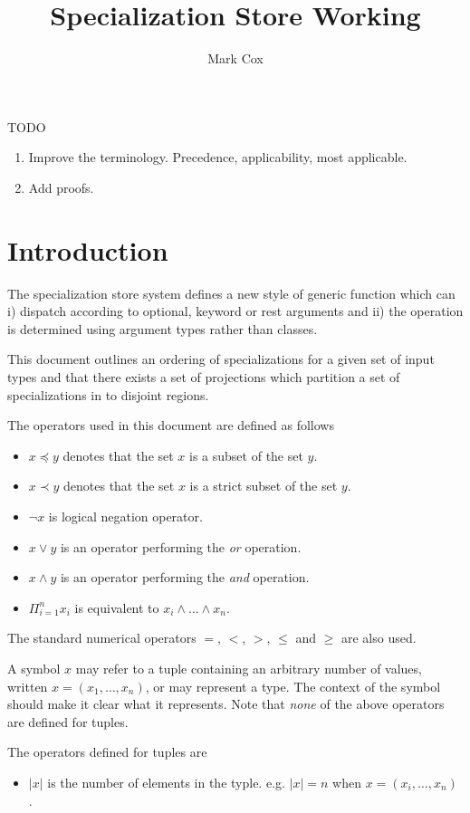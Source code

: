 \documentclass{article}
\title{Specialization Store Working}
\author{Mark Cox}
\begin{document}
\maketitle

TODO
\begin{enumerate}
\item Improve the terminology. Precedence, applicability, most
  applicable.
\item Add proofs.
\end{enumerate}

\section{Introduction}

The specialization store system defines a new style of generic
function which can i) dispatch according to optional, keyword or rest
arguments and ii) the operation is determined using argument types
rather than classes.

This document outlines an ordering of specializations for a given set
of input types and that there exists a set of projections which
partition a set of specializations in to disjoint regions.

The operators used in this document are defined as follows
\begin{itemize}
\item $ x \preceq y $ denotes that the set $x$ is a subset of the set $y$.
\item $ x \prec y$ denotes that the set $x$ is a strict subset of the set $y$.
\item $\lnot x $ is logical negation operator.
\item $x \lor y$ is an operator performing the \emph{or} operation.
\item $x \land y$ is an operator performing the \emph{and} operation.
\item $\Pi_{i=1}^n x_i $ is equivalent to $ x_i \land \dots \land x_n $.
\end{itemize}
The standard numerical operators $=$, $<$, $>$, $\leq$ and $\geq$ are
also used.

A symbol $x$ may refer to a tuple containing an arbitrary number of
values, written $x = (x_1, \dots, x_n)$, or may represent a type. The
context of the symbol should make it clear what it represents. Note
that \emph{none} of the above operators are defined for tuples.

The operators defined for tuples are
\begin{itemize}
\item $|x|$ is the number of elements in the typle. e.g. $|x| = n$
  when $ x = ( x_i, \dots, x_n ) $ .
\end{itemize}
\end{document}
